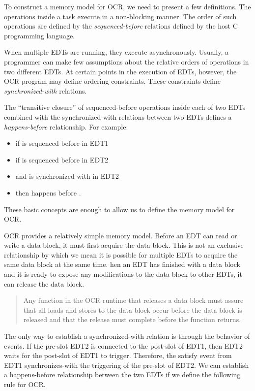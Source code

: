 To construct a memory model for OCR, we need to present a few
definitions. The operations inside a task execute in a non-blocking
manner. The order of such operations are defined by the
\emph{sequenced-before} relations defined by
the host C programming language.

When multiple EDTs are running, they execute asynchronously. Usually,
a programmer can make few assumptions about the relative orders of
operations in two different EDTs. At certain points in the execution
of EDTs, however, the OCR program may define ordering
constraints. These constraints define
\emph{synchronized-with} relations.

The ``transitive closure'' of sequenced-before operations inside each
of two EDTs combined with the synchronized-with relations between two
EDTs defines a \emph{happens-before}
relationship. For example:
\begin{itemize}
\item if  is sequenced before  in EDT1
\item  if  is sequenced before  in EDT2
\item and   is synchronized with   in EDT2
\item then  happens before .
\end{itemize}
These basic concepts are enough to allow us to define the memory model for OCR.

OCR provides a relatively simple memory model. Before an EDT can read
or write a data block, it must first acquire the data
block. This is not an exclusive relationship by which we mean it is
possible for multiple EDTs to acquire the same data block at the same
time.  hen an EDT has finished with a data block and it is ready
to expose any modifications to the data block to other EDTs, it can
release the data block.

\begin{quote}
Any function in the OCR runtime that releases a data block must assure
that all loads and stores to the data block occur before the data
block is released and that the release must complete before the
function returns.
\end{quote}

The only way to establish a synchronized-with relation is through the
behavior of events. If the pre-slot EDT2 is connected to the post-slot
of EDT1, then EDT2 waits for the post-slot of EDT1 to
trigger. Therefore, the satisfy event from EDT1 synchronizes-with the
triggering of the pre-slot of EDT2. We can establish a happens-before
relationship between the two EDTs if we define the following rule for
OCR.

